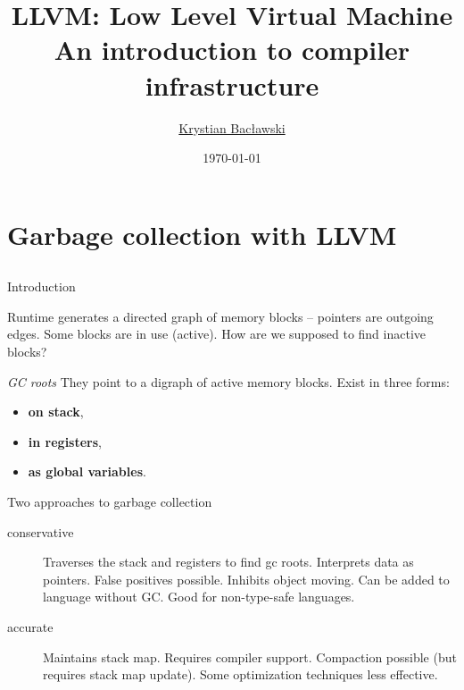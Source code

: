 \documentclass[8pt]{beamer}
\title[LLVM]{LLVM: Low Level Virtual Machine\\An introduction to compiler infrastructure}
\author[Krystian Bacławski]{\href{mailto:cahirwpz@cs.uni.wroc.pl}{Krystian Bacławski}}
\institute{Computer Science Department\\University of Wrocław}
\date{\today}
\begin{document}
\begin{frame}
\titlepage
\end{frame}

\section[Garbage collection]{Garbage collection with LLVM}
\subsection*{}

\begin{frame}{Introduction}
  \begin{alertblock}{}
    Runtime generates a directed graph of memory blocks -- pointers are
    outgoing edges. Some blocks are in use (active). How are we supposed to
    find inactive blocks?
  \end{alertblock}

  \begin{block}{\textit{GC roots}}
    They point to a digraph of active memory blocks. Exist in three forms:
    \begin{itemize}
      \item \textbf{on stack},
      \item \textbf{in registers},
      \item \textbf{as global variables}.
    \end{itemize}
  \end{block}

  \begin{block}{Two approaches to garbage collection}
    \begin{description}
      \item[conservative] Traverses the stack and registers to find gc roots.
        Interprets data as pointers. False positives possible. Inhibits object
        moving. Can be added to language without GC. Good for non-type-safe
        languages. 
      \item[accurate] Maintains stack map. Requires compiler support.
        Compaction possible (but requires stack map update). Some optimization
        techniques less effective.
    \end{description}
  \end{block}
\end{frame}
\end{document}
